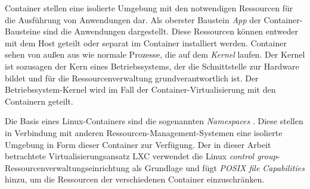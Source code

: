Container stellen eine isolierte Umgebung mit den notwendigen Ressourcen für die Ausführung von Anwendungen dar. Als oberster Baustein \emph{App} der Container-Bausteine sind die Anwendungen dargestellt. Diese Ressourcen können entweder mit dem Host geteilt oder separat im Container installiert werden. Container sehen von außen aus wie normale Prozesse, die auf dem \emph{Kernel} laufen. Der Kernel ist sozusagen der Kern eines Betriebssystems, der die Schnittstelle zur Hardware bildet und für die Ressourcenverwaltung grundverantwortlich ist. Der Betriebssystem-Kernel wird im Fall der Container-Virtualisierung mit den Containern geteilt. 

Die Basis eines Linux-Containers sind die sogenannten \emph{Namespaces} \cite{Also2018Man7.orgMan-pages}. Diese stellen in Verbindung mit anderen Ressourcen-Management-Systemen eine isolierte Umgebung in Form dieser Container zur Verfügung. Der in dieser Arbeit betrachtete Virtualisierungsansatz LXC verwendet die Linux \emph{control group}-Ressourcenverwaltungseinrichtung als Grundlage \cite{Heo2015ControlV2} und fügt \emph{POSIX file Capabilities} \cite{Overview2018PaperLinux-VServer} hinzu, um die Ressourcen der verschiedenen Container einzuschränken.







